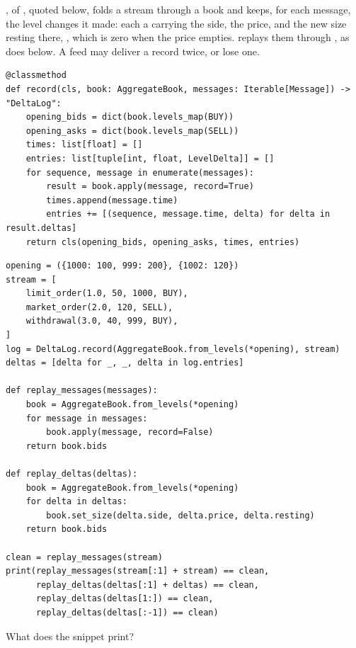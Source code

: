 \begin{question}
\label{question.deltaLogReplayIsIdempotent}
, of , quoted below,
folds a stream through a book
and keeps, for each message, the level changes it made:
each a  carrying the side, the price,
and the new size resting there, , which is zero when the price empties.
 replays them through ,
as  does below.
A feed may deliver a record twice, or lose one.
\begin{lstlisting}[caption={\protect\codehl{unito26.lob.delta\_log.DeltaLog.record}}, label=listing.deltaLogReplayIsIdempotentRecord]
@classmethod
def record(cls, book: AggregateBook, messages: Iterable[Message]) -> "DeltaLog":
    opening_bids = dict(book.levels_map(BUY))
    opening_asks = dict(book.levels_map(SELL))
    times: list[float] = []
    entries: list[tuple[int, float, LevelDelta]] = []
    for sequence, message in enumerate(messages):
        result = book.apply(message, record=True)
        times.append(message.time)
        entries += [(sequence, message.time, delta) for delta in result.deltas]
    return cls(opening_bids, opening_asks, times, entries)
\end{lstlisting}
\begin{lstlisting}[caption={A repeated and a lost record}, label=listing.deltaLogReplayIsIdempotentReplays]
opening = ({1000: 100, 999: 200}, {1002: 120})
stream = [
    limit_order(1.0, 50, 1000, BUY),
    market_order(2.0, 120, SELL),
    withdrawal(3.0, 40, 999, BUY),
]
log = DeltaLog.record(AggregateBook.from_levels(*opening), stream)
deltas = [delta for _, _, delta in log.entries]

def replay_messages(messages):
    book = AggregateBook.from_levels(*opening)
    for message in messages:
        book.apply(message, record=False)
    return book.bids

def replay_deltas(deltas):
    book = AggregateBook.from_levels(*opening)
    for delta in deltas:
        book.set_size(delta.side, delta.price, delta.resting)
    return book.bids

clean = replay_messages(stream)
print(replay_messages(stream[:1] + stream) == clean,
      replay_deltas(deltas[:1] + deltas) == clean,
      replay_deltas(deltas[1:]) == clean,
      replay_deltas(deltas[:-1]) == clean)
\end{lstlisting}
What does the snippet print?
\begin{choices}
 \correctchoice {}
 \choice {}
 \choice {}
 \choice {}
\end{choices}
\end{question}

